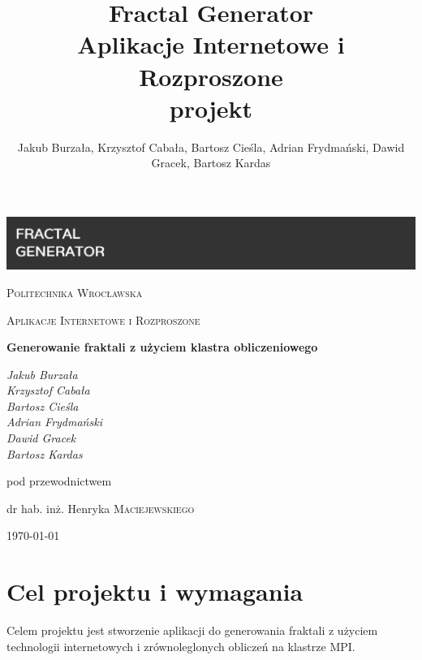 \documentclass[a4paper]{article}
\title{\textbf{Fractal Generator} \\ Aplikacje Internetowe i Rozproszone \\ projekt}
\author{Jakub Burzała, Krzysztof Cabała, Bartosz Cieśla, Adrian Frydmański, Dawid Gracek, Bartosz Kardas}
\begin{document}
\begin{titlepage}
	\centering
	\includegraphics[width=\textwidth]{banner2.png}\par\vspace{1cm}
	{\scshape\LARGE Politechnika Wrocławska \par}
	\vspace{1cm}
	{\scshape\Large Aplikacje Internetowe i Rozproszone\par}
	\vspace{1.5cm}
	{\huge\bfseries Generowanie fraktali z użyciem klastra obliczeniowego \par}
	\vspace{2cm}
	{\Large\itshape Jakub Burzała \\ Krzysztof Cabała \\ Bartosz Cieśla \\ Adrian Frydmański \\ Dawid Gracek \\ Bartosz Kardas \par}
	\vfill
	pod przewodnictwem\par
	dr hab. inż. Henryka \textsc{Maciejewskiego}

	\vfill

	{\large \today\par}
\end{titlepage}

\newpage
\clearpage
\tableofcontents
\newpage

\section{Cel projektu i wymagania}
Celem projektu jest stworzenie aplikacji do generowania fraktali z użyciem technologii internetowych i zrównoleglonych obliczeń na klastrze MPI.
\end{document}
